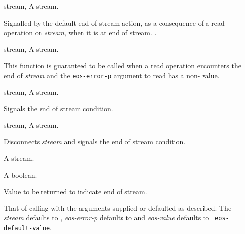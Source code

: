 \begin{optDefinition}
\begin{initoptions}
    \item[stream, \classref{stream}] A stream.
\end{initoptions}
%
\remarks%
Signalled by the default end of stream action, as a consequence of a
read operation on {\em stream\/}, when it is at end of stream.
%
\seealso%
.

\begin{genericargs}
    \item[stream, \classref{buffered-stream}] A stream.
\end{genericargs}
%
\remarks%
This function is guaranteed to be called when a read operation
encounters the end of {\em stream\/} and the {\tt eos-error-p} argument to read
has a non-\nil\/ value.

\begin{specargs}
    \item[stream, \classref{buffered-stream}] A stream.
\end{specargs}
%
\remarks%
Signals the end of stream condition.

\begin{specargs}
    \item[stream, \classref{file-stream}] A stream.
\end{specargs}
%
\remarks%
Disconnects {\em stream\/} and signals the end of stream condition.


\begin{arguments}
    \item[\optional{stream}] A stream.
    \item[\optional{eos-error-p}] A boolean.
    \item[\optional{eos-value}] Value to be returned to indicate end of stream.
\end{arguments}
%
\result%
That of calling  with the arguments supplied or
defaulted as described.
%
\remarks%
The {\em stream\/} defaults to , {\em
    eos-error-p\/} defaults to \nil\/ and {\em eos-value\/} defaults to {\tt
    eos-default-value}.


\end{optDefinition}
